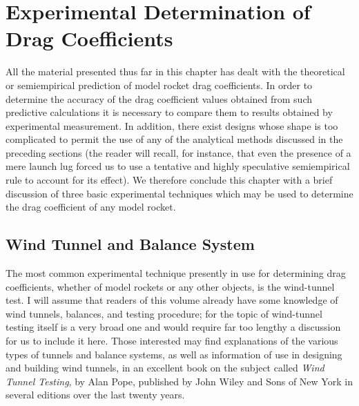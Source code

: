 \section{Experimental Determination of Drag Coefficients}\label{ch3:sec:8}

All the material presented thus far in this chapter has dealt with the
theoretical or semiempirical prediction of model rocket drag coefficients. In
order to determine the accuracy of the drag coefficient values obtained from
such predictive calculations it is necessary to compare them to results
obtained by experimental measurement. In addition, there exist designs whose
shape is too complicated to permit the use of any of the analytical methods
discussed in the preceding sections (the reader will recall, for instance, that
even the presence of a mere launch lug forced us to use a tentative and highly
speculative semiempirical rule to account for its effect). We therefore
conclude this chapter with a brief discussion of three basic experimental
techniques which may be used to determine the drag coefficient of any model
rocket.

\subsection{Wind Tunnel and Balance System}\label{ch3:sec:8.1}

The most common experimental technique presently in use for determining drag
coefficients, whether of model rockets or any other objects, is the
wind-tunnel test. I will assume that readers of this volume already have some
knowledge of wind tunnels, balances, and testing procedure; for the topic of
wind-tunnel testing itself is a very broad one and would require far too
lengthy a discussion for us to include it here. Those interested may find
explanations of the various types of tunnels and balance systems, as well as
information of use in designing and building wind tunnels, in an excellent
book on the subject called \emph{Wind Tunnel Testing}, by Alan Pope, published
by John Wiley and Sons of New York in several editions over the last twenty
years.

